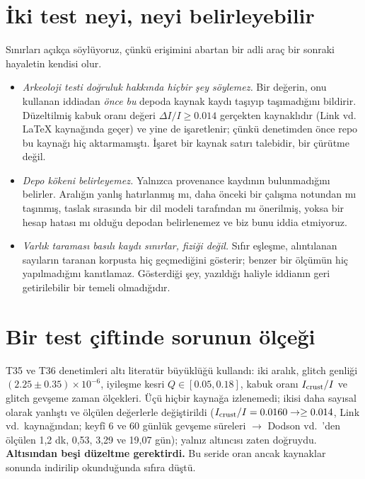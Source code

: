\documentclass[11pt,a4paper]{article}
\begin{document}
\section{İki test neyi, neyi belirleyebilir}
Sınırları açıkça söylüyoruz, çünkü erişimini abartan bir adli araç bir sonraki
hayaletin kendisi olur.
\begin{itemize}
    \item \emph{Arkeoloji testi doğruluk hakkında hiçbir şey söylemez.}
    Bir değerin, onu kullanan iddiadan \emph{önce} \emph{bu} depoda kaynak
    kaydı taşıyıp taşımadığını bildirir. Düzeltilmiş kabuk oranı değeri
    $\Delta I/I \ge 0.014$ gerçekten kaynaklıdır (Link vd.~\cite{link1999}
    LaTeX kaynağında geçer) ve yine de işaretlenir; çünkü denetimden önce
    repo bu kaynağı hiç aktarmamıştı. İşaret bir kaynak satırı talebidir,
    bir çürütme değil.
    \item \emph{Depo kökeni belirleyemez.} Yalnızca provenance kaydının
    bulunmadığını belirler. Aralığın yanlış hatırlanmış mı, daha önceki bir
    çalışma notundan mı taşınmış, taslak sırasında bir dil modeli tarafından
    mı önerilmiş, yoksa bir hesap hatası mı olduğu depodan belirlenemez ve
    biz bunu iddia etmiyoruz.
    \item \emph{Varlık taraması basılı kaydı sınırlar, fiziği değil.} Sıfır
    eşleşme, alıntılanan sayıların taranan korpusta hiç geçmediğini
    gösterir; benzer bir ölçümün hiç yapılmadığını kanıtlamaz. Gösterdiği
    şey, yazıldığı haliyle iddianın geri getirilebilir bir temeli
    olmadığıdır.
\end{itemize}

\section{Bir test çiftinde sorunun ölçeği}
T35 ve T36 denetimleri altı literatür büyüklüğü kullandı: iki aralık, glitch
genliği $(2.25\pm0.35)\times10^{-6}$, iyileşme kesri $Q\in[0.05,0.18]$,
kabuk oranı $I_{\rm crust}/I$ ve glitch gevşeme zaman ölçekleri. Üçü hiçbir
kaynağa izlenemedi; ikisi daha sayısal olarak yanlıştı ve ölçülen değerlerle
değiştirildi ($I_{\rm crust}/I = 0.0160 \rightarrow \ge 0.014$, Link vd.\
kaynağından; keyfî 6 ve 60 günlük gevşeme süreleri $\rightarrow$ Dodson vd.\
\cite{dodson2002}'den ölçülen 1,2 dk, 0,53, 3,29 ve 19,07 gün); yalnız altıncısı
zaten doğruydu. \textbf{Altısından beşi düzeltme gerektirdi.} Bu seride oran
ancak kaynaklar sonunda indirilip okunduğunda sıfıra düştü.
\end{document}
